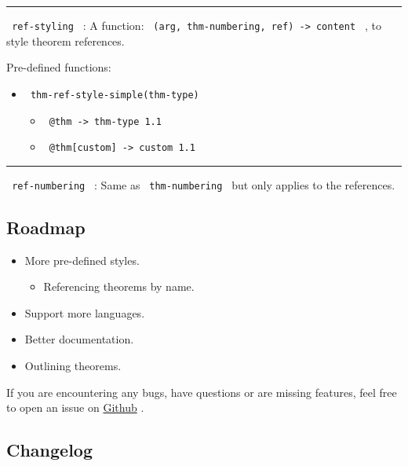 \begin{center}\rule{0.5\linewidth}{0.5pt}\end{center}

\texttt{\ ref-styling\ } : A function:
\texttt{\ (arg,\ thm-numbering,\ ref)\ -\textgreater{}\ content\ } , to
style theorem references.

Pre-defined functions:

\begin{itemize}
\tightlist
\item
  \texttt{\ thm-ref-style-simple(thm-type)\ }

  \begin{itemize}
  \tightlist
  \item
    \texttt{\ @thm\ -\textgreater{}\ thm-type\ 1.1\ }
  \item
    \texttt{\ @thm{[}custom{]}\ -\textgreater{}\ custom\ 1.1\ }
  \end{itemize}
\end{itemize}

\begin{center}\rule{0.5\linewidth}{0.5pt}\end{center}

\texttt{\ ref-numbering\ } : Same as \texttt{\ thm-numbering\ } but only
applies to the references.

\subsection{Roadmap}\label{roadmap}

\begin{itemize}
\tightlist
\item
  More pre-defined styles.

  \begin{itemize}
  \tightlist
  \item
    Referencing theorems by name.
  \end{itemize}
\item
  Support more languages.
\item
  Better documentation.
\item
  Outlining theorems.
\end{itemize}

If you are encountering any bugs, have questions or are missing
features, feel free to open an issue on
\href{https://github.com/Marmare314/lemmify}{Github} .

\subsection{Changelog}\label{changelog}

